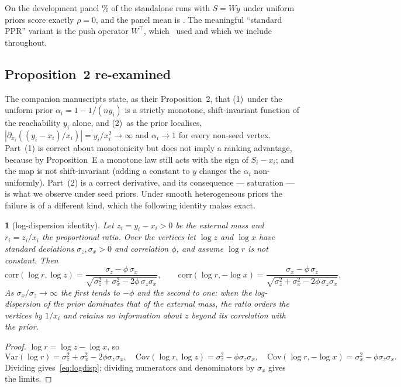 \documentclass[11pt,a4paper]{article}
\theoremstyle{definition}
\theoremstyle{plain}
\newcommand{\genpropname}{}
\newtheorem*{genprop}{\genpropname}
\newenvironment{prop}[1]{\renewcommand{\genpropname}{Proposition #1}\begin{genprop}}{\end{genprop}}
\begin{document}
On the development panel \PullZeroPct\% of the standalone runs with $S=Wy$ under uniform priors score exactly $\rho=0$, and the panel mean is \PullMean. The meaningful ``standard PPR'' variant is the push operator $W^{\top}$, which~\cite{konstantellos26} used and which we include throughout.

\subsection{Proposition~2 re-examined}\label{sec:prop2}

The companion manuscripts state, as their Proposition~2, that (1)~under the uniform prior $\alpha_i=1-1/(ny_i)$ is a strictly monotone, shift-invariant function of the reachability $y_i$ alone, and (2)~as the prior localises, $|\partial_{x_i}((y_i-x_i)/x_i)|=y_i/x_i^2\to\infty$ and $\alpha_i\to1$ for every non-seed vertex. Part~(1) is correct about monotonicity but does not imply a ranking advantage, because by Proposition~E a monotone law still acts with the sign of $S_i-x_i$; and the map is not shift-invariant (adding a constant to $y$ changes the $\alpha_i$ non-uniformly). Part~(2) is a correct derivative, and its consequence --- saturation --- is what we observe under seed priors. Under smooth heterogeneous priors the failure is of a different kind, which the following identity makes exact.

\begin{prop}{$2'$}[log-dispersion identity]
Let $z_i=y_i-x_i>0$ be the external mass and $r_i=z_i/x_i$ the proportional ratio. Over the vertices let $\log z$ and $\log x$ have standard deviations $\sigma_z,\sigma_x>0$ and correlation $\phi$, and assume $\log r$ is not constant. Then
\begin{equation}\label{eq:logdisp}
\mathrm{corr}(\log r,\log z)=\frac{\sigma_z-\phi\,\sigma_x}{\sqrt{\sigma_z^2+\sigma_x^2-2\phi\,\sigma_z\sigma_x}},\qquad
\mathrm{corr}(\log r,-\log x)=\frac{\sigma_x-\phi\,\sigma_z}{\sqrt{\sigma_z^2+\sigma_x^2-2\phi\,\sigma_z\sigma_x}} .
\end{equation}
As $\sigma_x/\sigma_z\to\infty$ the first tends to $-\phi$ and the second to one: when the log-dispersion of the prior dominates that of the external mass, the ratio orders the vertices by $1/x_i$ and retains no information about $z$ beyond its correlation with the prior.
\end{prop}

\begin{proof}
$\log r=\log z-\log x$, so
\[
\mathrm{Var}(\log r)=\sigma_z^2+\sigma_x^2-2\phi\sigma_z\sigma_x,\quad
\mathrm{Cov}(\log r,\log z)=\sigma_z^2-\phi\sigma_z\sigma_x,\quad
\mathrm{Cov}(\log r,-\log x)=\sigma_x^2-\phi\sigma_z\sigma_x.
\]
Dividing gives~\eqref{eq:logdisp}; dividing numerators and denominators by $\sigma_x$ gives the limits.
\end{proof}
\end{document}
